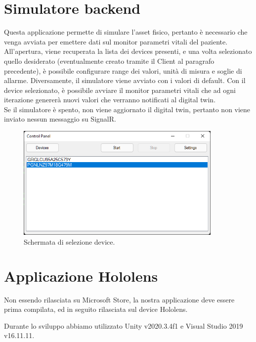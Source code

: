 \section{Simulatore backend}
Questa applicazione permette di simulare l'asset fisico, pertanto è necessario che venga avviata per emettere dati sul monitor parametri vitali del paziente. \newline \newline All'apertura, viene recuperata la lista dei devices presenti, e una volta selezionato quello desiderato (eventualmente creato tramite il Client al paragrafo precedente), è possibile configurare range dei valori, unità di misura e soglie di allarme. Diversamente, il simulatore viene avviato con i valori di default.
Con il device selezionato, è possibile avviare il monitor parametri vitali che ad ogni iterazione genererà nuovi valori che verranno notificati al digital twin.\\
\newline Se il simulatore è spento, non viene aggiornato il digital twin, pertanto non viene inviato nessun messaggio su SignalR.

\begin{figure}[H]
    \includegraphics[width=10cm]{Images/simulator_screen.png}
    \centering
    \caption{\label{pic:simulator-deployment}Schermata di selezione device.}
\end{figure}

\section{Applicazione Hololens}
Non essendo rilasciata su Microsoft Store, la nostra applicazione deve essere prima compilata, ed in seguito rilasciata sul device Hololens.

Durante lo sviluppo abbiamo utilizzato Unity v2020.3.4f1 e Visual Studio 2019 v16.11.11.

